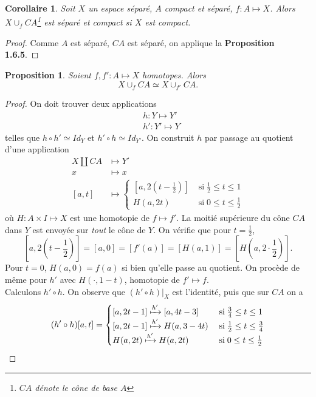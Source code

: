 \documentclass[12pt]{book}
\newtheorem{cor}[lemma]{Corollaire}
\newtheorem{prop}[lemma]{Proposition}
\theoremstyle{definition}
\theoremstyle{remark}
\begin{document}
	\begin{cor}
		Soit $X$ un espace séparé, $A$ compact et séparé, $f : A\longmapsto X$. Alors $X \cup_f CA$\footnote{$CA$ dénote le cône de base  $A$} est séparé et compact si $X$ est compact.
	\end{cor}
	\begin{proof}
		Comme $A$ est séparé, $CA$ est séparé, on applique la \textbf{Proposition 1.6.5}.
	\end{proof}
	\begin{prop}
		Soient $f,f' : A \longmapsto X$ homotopes. Alors \[
			X \cup_f CA \simeq X \cup_{f'} CA
		.\] 
	\end{prop}
	\begin{proof}
		On doit trouver deux applications
		\begin{align*}
			&h : Y \longmapsto Y' \\
			&h' : Y' \longmapsto Y
		\end{align*}
		telles que $h\circ h' \simeq Id_Y$ et $h'\circ h \simeq Id_{Y'}$. 
		On construit $h$ par passage au quotient d'une application 
		 \begin{align*}
			 X \amalg CA &\longmapsto Y' \\
				 x&\longmapsto x \\
				 [a,t]& \longmapsto \begin{cases}
					 [a,2(t-\frac{1}{2})] \; &\text{si} \; \frac{1}{2} \le t \le 1 \\
					 H(a,2t) \; &\text{si} \; 0 \le t \le \frac{1}{2}
			 \end{cases}
		\end{align*}
		où $H : A \times I \longmapsto X$ est une homotopie de $f \longmapsto f'$.
		La moitié supérieure du cône $CA$ dans $Y$ est envoyée sur \emph{tout} le cône de $Y$. On vérifie que pour $t=\frac{1}{2}$, \[[a,2(t-\frac{1}{2})] = [a,0] = [f'(a)] = [H(a,1)] = [H(a,2\cdot \frac{1}{2})].\]
		Pour $t=0$, $H(a,0) = f(a)$ si bien qu'elle passe au quotient. On procède de même pour $h'$ avec $H(\cdot , 1-t)$, homotopie de  $f' \longmapsto f$. \\
		Calculons $h' \circ h$. On observe que $(h'\circ h)|_X$ est l'identité, puis que sur $CA$ on a \[
			(h'\circ h)[a,t] = \begin{cases}
				[a,2t-1] \xmapsto{h'} [a,4t-3] \; &\text{si} \; \frac{3}{4} \le t \le 1 \\
				[a,2t-1] \xmapsto{h'} H(a,3-4t) \; &\text{si} \; \frac{1}{2} \le t \le \frac{3}{4} \\
				H(a,2t) \xmapsto{h'} H(a,2t) \; &\text{si} \; 0 \le t \le \frac{1}{2}

\end{cases}\]
\end{proof}
\end{document}
